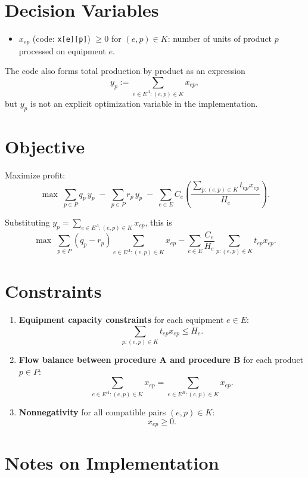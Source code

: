 \section*{Decision Variables}

\begin{itemize}
    \item $x_{ep}$ (code: \texttt{x[e][p]}) $\ge 0$ for $(e,p)\in K$: number of units of product $p$ processed on equipment $e$.
\end{itemize}

The code also forms total production by product as an expression
\[
y_p := \sum_{e\in E^A:(e,p)\in K} x_{ep},
\]
but $y_p$ is not an explicit optimization variable in the implementation.

\section*{Objective}

Maximize profit:
\[
\max \; \sum_{p\in P} q_p\, y_p
\;-\;
\sum_{p\in P} r_p\, y_p
\;-\;
\sum_{e\in E} C_e
\left(
\frac{\sum_{p:(e,p)\in K} t_{ep} x_{ep}}{H_e}
\right).
\]

Substituting $y_p=\sum_{e\in E^A:(e,p)\in K}x_{ep}$, this is
\[
\max \;
\sum_{p\in P}(q_p-r_p)\sum_{e\in E^A:(e,p)\in K}x_{ep}
-
\sum_{e\in E} \frac{C_e}{H_e}\sum_{p:(e,p)\in K} t_{ep}x_{ep}.
\]

\section*{Constraints}

\begin{enumerate}
    \item \textbf{Equipment capacity constraints} for each equipment $e\in E$:
    \[
    \sum_{p:(e,p)\in K} t_{ep} x_{ep} \le H_e.
    \]

    \item \textbf{Flow balance between procedure A and procedure B} for each product $p\in P$:
    \[
    \sum_{e\in E^A:(e,p)\in K} x_{ep}
    =
    \sum_{e\in E^B:(e,p)\in K} x_{ep}.
    \]

    \item \textbf{Nonnegativity} for all compatible pairs $(e,p)\in K$:
    \[
    x_{ep}\ge 0.
    \]
\end{enumerate}

\section*{Notes on Implementation}

